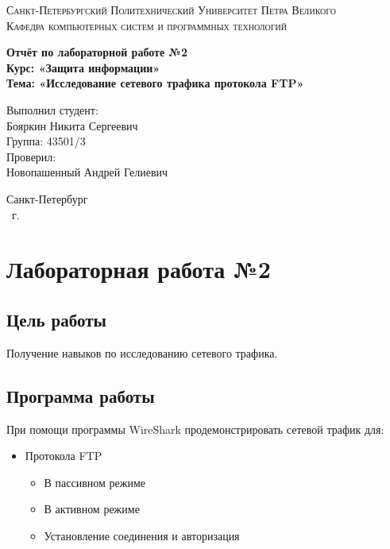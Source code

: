 \documentclass[14pt,a4paper,report]{report}
\begin{document}
\def\contentsname{Содержание}

\begin{titlepage}
	\begin{center}
		\textsc{Санкт-Петербургский Политехнический 
			Университет Петра Великого\\[5mm]
			Кафедра компьютерных систем и программных технологий}
		
		\vfill
		
		\textbf{Отчёт по лабораторной работе №2\\[3mm]
			Курс: «Защита информации»\\[6mm]
			Тема: «Исследование сетевого трафика протокола FTP»\\[35mm]
		}
	\end{center}
	
	\hfill
	\begin{minipage}{.5\textwidth}
		Выполнил студент:\\[2mm] 
		Бояркин Никита Сергеевич\\
		Группа: 43501/3\\[5mm]
		
		Проверил:\\[2mm] 
		Новопашенный Андрей Гелиевич
	\end{minipage}
	\vfill
	\begin{center}
		Санкт-Петербург\\ \the\year\ г.
	\end{center}
\end{titlepage}

\tableofcontents
\clearpage

\chapter{Лабораторная работа №2}

\section{Цель работы}

Получение навыков по исследованию сетевого трафика.

\section{Программа работы}

При помощи программы WireShark продемонстрировать сетевой трафик для:

\begin{itemize}
	\item Протокола FTP
		\begin{itemize}
			\item В пассивном режиме
			\item В активном режиме
			\item Установление соединения и авторизация
		\end{itemize}
\end{itemize}
\end{document}
